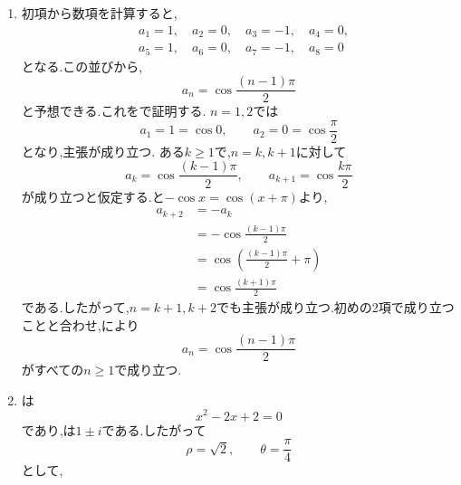   \noindent{}\par\nobreak
  \begin{enumerate}[label=(\arabic*),parsep=3pt,format=\bookitemlink{example-complex-1}{solution}{problem}]
    \item 初項から数項を計算すると,
          \begin{align*}
            &a_1=1,\quad a_2=0,\quad a_3=-1,\quad a_4=0,\\
            &a_5=1,\quad a_6=0,\quad a_7=-1,\quad a_8=0
          \end{align*}
          となる.この並びから,
          \[
            a_n=\cos\frac{(n-1)\pi}{2}
          \]
          と予想できる.これをで証明する.
          $n=1,2$では
          \[
            a_1=1=\cos0,\qquad a_2=0=\cos\frac{\pi}{2}
          \]
          となり,主張が成り立つ.
          ある$k\ge1$で,$n=k,k+1$に対して
          \[
            a_k=\cos\frac{(k-1)\pi}{2},\qquad
            a_{k+1}=\cos\frac{k\pi}{2}
          \]
          が成り立つと仮定する.と$-\cos x=\cos(x+\pi)$より,
          \[
            \begin{aligned}
              a_{k+2}
              &=-a_k\\
              &=-\cos\frac{(k-1)\pi}{2}\\
              &=\cos\left(\frac{(k-1)\pi}{2}+\pi\right)\\
              &=\cos\frac{(k+1)\pi}{2}
            \end{aligned}
          \]
          である.したがって,$n=k+1,k+2$でも主張が成り立つ.初めの2項で成り立つことと合わせ,により
          \[
            a_n=\cos\frac{(n-1)\pi}{2}
          \]
          がすべての$n\ge1$で成り立つ.
    \item {}は
          \[
            x^2-2x+2=0
          \]
          であり,は$1\pm i$である.したがって
          \[
            \rho=\sqrt2,\qquad\theta=\frac{\pi}{4}
          \]
          として,
\BookMathLayout{\[
            a_n=(\sqrt2)^{n-1}
            \left(
              C\cos\frac{(n-1)\pi}{4}
              +D\sin\frac{(n-1)\pi}{4}
            \right)
          \]}{
\[
\begin{aligned}
a_n&=(\sqrt2)^{n-1}\Bigl(C\cos\frac{(n-1)\pi}{4}\\
&\hspace{4zw}+D\sin\frac{(n-1)\pi}{4}\Bigr)
\end{aligned}
\]}
\end{enumerate}
